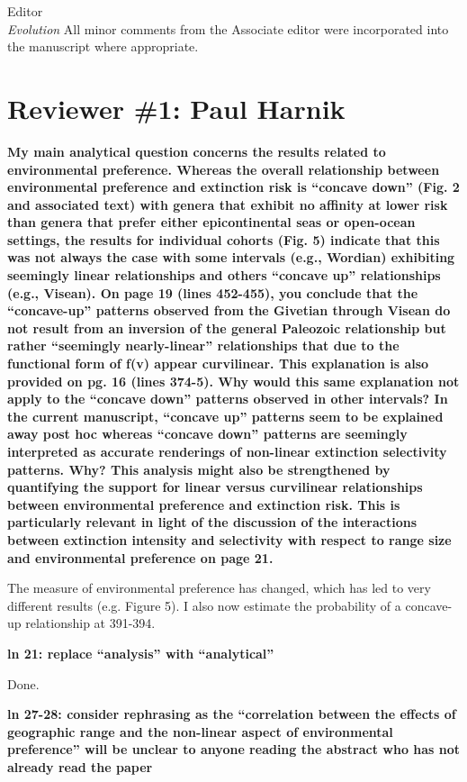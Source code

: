 \documentclass{letter}
\begin{document}
\begin{letter}{Editor \\ \textit{Evolution}}
  All minor comments from the Associate editor were incorporated into the manuscript where appropriate.
 
  \section{Reviewer \#1: Paul Harnik}
  \textbf{My main analytical question concerns the results related to environmental preference. Whereas the overall relationship between environmental preference and extinction risk is “concave down” (Fig. 2 and associated text) with genera that exhibit no affinity at lower risk than genera that prefer either epicontinental seas or open-ocean settings, the results for individual cohorts (Fig. 5) indicate that this was not always the case with some intervals (e.g., Wordian) exhibiting seemingly linear relationships and others “concave up” relationships (e.g., Visean). On page 19 (lines 452-455), you conclude that the “concave-up” patterns observed from the Givetian through Visean do not result from an inversion of the general Paleozoic relationship but rather “seemingly nearly-linear” relationships that due to the functional form of f(v) appear curvilinear. This explanation is also provided on pg. 16 (lines 374-5). Why would this same explanation not apply to the “concave down” patterns observed in other intervals? In the current manuscript, “concave up” patterns seem to be explained away post hoc whereas “concave down” patterns are seemingly interpreted as accurate renderings of non-linear extinction selectivity patterns. Why? This analysis might also be strengthened by quantifying the support for linear versus curvilinear relationships between environmental preference and extinction risk. This is particularly relevant in light of the discussion of the interactions between extinction intensity and selectivity with respect to range size and environmental preference on page 21.}

  The measure of environmental preference has changed, which has led to very different results (e.g. Figure 5). I also now estimate the probability of a concave-up relationship at 391-394.

  \textbf{ln 21: replace “analysis” with “analytical”}

  Done.

  \textbf{ln 27-28: consider rephrasing as the “correlation between the effects of geographic range and the non-linear aspect of environmental preference” will be unclear to anyone reading the abstract who has not already read the paper}


\end{letter}
\end{document}
